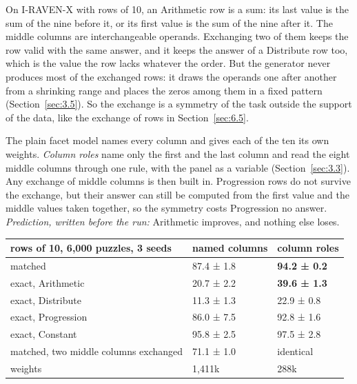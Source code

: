 On I-RAVEN-X with rows of 10, an Arithmetic row is a sum: its last value is the sum of the nine before it, or its first value is the sum of the nine after it. The middle columns are interchangeable operands. Exchanging two of them keeps the row valid with the same answer, and it keeps the answer of a Distribute row too, which is the value the row lacks whatever the order. But the generator never produces most of the exchanged rows: it draws the operands one after another from a shrinking range and places the zeros among them in a fixed pattern (Section~\ref{sec:3.5}). So the exchange is a symmetry of the task outside the support of the data, like the exchange of rows in Section~\ref{sec:6.5}.

The plain facet model names every column and gives each of the ten its own weights. \emph{Column roles} name only the first and the last column and read the eight middle columns through one rule, with the panel as a variable (Section~\ref{sec:3.3}). Any exchange of middle columns is then built in. Progression rows do not survive the exchange, but their answer can still be computed from the first value and the middle values taken together, so the symmetry costs Progression no answer. \emph{Prediction, written before the run:} Arithmetic improves, and nothing else loses.

\begin{center}\small
\begin{tabular}{@{}lll@{}}
\toprule
rows of 10, 6,000 puzzles, 3 seeds & named columns & column roles \\
\midrule
matched & 87.4 ± 1.8 & \textbf{94.2 ± 0.2} \\
exact, Arithmetic & 20.7 ± 2.2 & \textbf{39.6 ± 1.3} \\
exact, Distribute & 11.3 ± 1.3 & 22.9 ± 0.8 \\
exact, Progression & 86.0 ± 7.5 & 92.8 ± 1.6 \\
exact, Constant & 95.8 ± 2.5 & 97.5 ± 2.8 \\
matched, two middle columns exchanged & 71.1 ± 1.0 & identical \\
weights & 1,411k & 288k \\
\bottomrule
\end{tabular}
\end{center}

